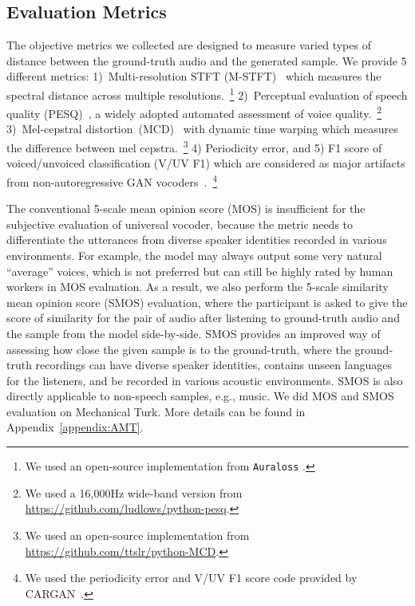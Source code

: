 \documentclass{article} \usepackage{iclr2023_conference,times}
\theoremstyle{plain}
\theoremstyle{definition}
\theoremstyle{remark}
\begin{document}
\vspace{-.2cm}
\subsection{Evaluation Metrics}
\vspace{-.1cm}
The objective metrics we collected are designed to measure varied types of distance between the ground-truth audio and the generated sample. We provide 5 different metrics: 
1)~Multi-resolution STFT (M-STFT)~\citep{yamamoto2020parallel} which measures the spectral distance across multiple resolutions.~\footnote{We used an open-source implementation from \texttt{Auraloss} \citep{steinmetz2020auraloss}.}
2)~Perceptual evaluation of speech quality (PESQ)~\citep{rix2001perceptual}, a widely adopted automated assessment of voice quality.~\footnote{We used a 16,000Hz wide-band version from \url{https://github.com/ludlows/python-pesq}.}
3)~Mel-cepstral distortion~(MCD)~\citep{kubichek1993mel} with dynamic time warping  which measures the difference between mel cepstra.~\footnote{We used an open-source implementation from \url{https://github.com/ttslr/python-MCD}.}
4) Periodicity error, and 
5) F1 score of voiced/unvoiced classification (V/UV F1) which are considered as major artifacts from non-autoregressive GAN vocoders~\citep{morrison2021chunked}.~\footnote{We used the periodicity error and V/UV F1 score code provided by CARGAN~\citep{morrison2021chunked}.}

The conventional 5-scale mean opinion score (MOS) is insufficient for the subjective evaluation of universal vocoder, because the metric needs to differentiate the utterances from diverse speaker identities recorded in various environments. For example, the model may always output some very natural ``average'' voices, which is not preferred but can still be highly rated by human workers in MOS evaluation.
As a result, we also perform the 5-scale similarity mean opinion score (SMOS) evaluation, where the participant is asked to give the score of similarity for the pair of audio after listening to ground-truth audio and the sample from the model side-by-side. SMOS provides an improved way of assessing how close the given sample is to the ground-truth, where the ground-truth recordings can have diverse speaker identities, contains unseen languages for the listeners, and be recorded in various acoustic environments. SMOS is also directly applicable to non-speech samples, e.g., music. 
We did MOS and SMOS evaluation on Mechanical Turk. More details can be found in Appendix~\ref{appendix:AMT}.
\end{document}

